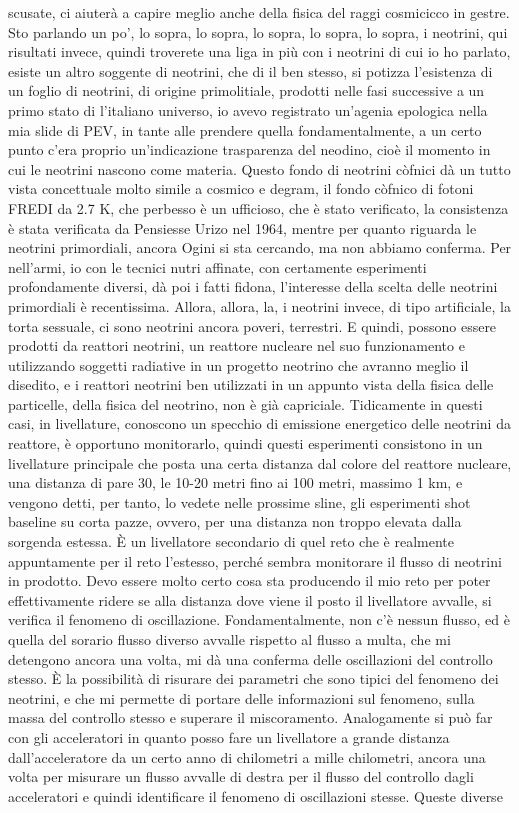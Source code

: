 scusate, ci aiuterà a capire meglio anche della fisica del raggi cosmicicco in gestre. Sto parlando un po', lo sopra, lo sopra, lo sopra, lo sopra, lo sopra, i neotrini, qui risultati invece, quindi troverete una liga in più con i neotrini di cui io ho parlato, esiste un altro soggente di neotrini, che di il ben stesso, si potizza l'esistenza di un foglio di neotrini, di origine primolitiale, prodotti nelle fasi successive a un primo stato di l'italiano universo, io avevo registrato un'agenia epologica nella mia slide di PEV, in tante alle prendere quella fondamentalmente, a un certo punto c'era proprio un'indicazione trasparenza del neodino, cioè il momento in cui le neotrini nascono come materia. Questo fondo di neotrini còfnici dà un tutto vista concettuale molto simile a cosmico e degram, il fondo còfnico di fotoni FREDI da 2.7 K, che perbesso è un ufficioso, che è stato verificato, la consistenza è stata verificata da Pensiesse Urizo nel 1964, mentre per quanto riguarda le neotrini primordiali, ancora Ogini si sta cercando, ma non abbiamo conferma. Per nell'armi, io con le tecnici nutri affinate, con certamente esperimenti profondamente diversi, dà poi i fatti fidona, l'interesse della scelta delle neotrini primordiali è recentissima. Allora, allora, la, i neotrini invece, di tipo artificiale, la torta sessuale, ci sono neotrini ancora poveri, terrestri. E quindi, possono essere prodotti da reattori neotrini, un reattore nucleare nel suo funzionamento e utilizzando soggetti radiative in un progetto neotrino che avranno meglio il disedito, e i reattori neotrini ben utilizzati in un appunto vista della fisica delle particelle, della fisica del neotrino, non è già capriciale. Tidicamente in questi casi, in livellature, conoscono un specchio di emissione energetico delle neotrini da reattore, è opportuno monitorarlo, quindi questi esperimenti consistono in un livellature principale che posta una certa distanza dal colore del reattore nucleare, una distanza di pare 30, le 10-20 metri fino ai 100 metri, massimo 1 km, e vengono detti, per tanto, lo vedete nelle prossime sline, gli esperimenti shot baseline su corta pazze, ovvero, per una distanza non troppo elevata dalla sorgenda estessa. È un livellatore secondario di quel reto che è realmente appuntamente per il reto l'estesso, perché sembra monitorare il flusso di neotrini in prodotto. Devo essere molto certo cosa sta producendo il mio reto per poter effettivamente ridere se alla distanza dove viene il posto il livellatore avvalle, si verifica il fenomeno di oscillazione. Fondamentalmente, non c'è nessun flusso, ed è quella del sorario flusso diverso avvalle rispetto al flusso a multa, che mi detengono ancora una volta, mi dà una conferma delle oscillazioni del controllo stesso. È la possibilità di risurare dei parametri che sono tipici del fenomeno dei neotrini, e che mi permette di portare delle informazioni sul fenomeno, sulla massa del controllo stesso e superare il miscoramento. Analogamente si può far con gli acceleratori in quanto posso fare un livellatore a grande distanza dall'acceleratore da un certo anno di chilometri a mille chilometri, ancora una volta per misurare un flusso avvalle di destra per il flusso del controllo dagli acceleratori e quindi identificare il fenomeno di oscillazioni stesse. Queste diverse 